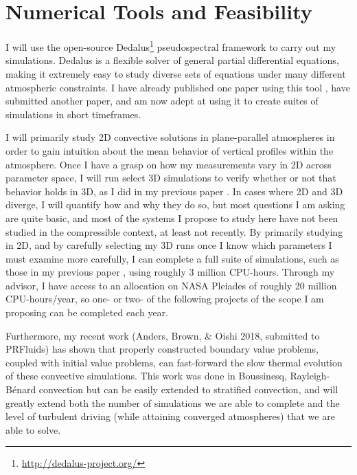 \documentclass[aasms,12pt]{article}
\newcommand{\RB}{Rayleigh-B\'{e}nard }
\begin{document}
\section{Numerical Tools and Feasibility}
I will use the open-source Dedalus\footnote{\url{http://dedalus-project.org/}} pseudospectral framework 
\cite{burns&all2016} to carry out my simulations.  
Dedalus is a flexible solver of general partial differential equations,
making it extremely easy to study diverse sets of equations under many different atmospheric
constraints.  I have already published one paper using this tool \cite{anders&brown2017},
have submitted another paper, and am now adept at using it to create suites of simulations
in short timeframes.

I will primarily study 2D convective solutions in plane-parallel atmospheres in order to gain
intuition about the mean behavior of vertical profiles within the atmosphere.  Once I have a grasp
on how my measurements vary in 2D across parameter space, I will run select 3D simulations to
verify whether or not that behavior holds in 3D, as I did in my previous paper \cite{anders&brown2017}.
In cases where 2D and 3D diverge, I will quantify how and why they do so, but most questions I am
asking are quite basic, and most of the systems I propose to study here have not been studied
in the compressible context, at least not recently.  By primarily studying in 2D, and by carefully
selecting my 3D runs once I know which parameters I must examine more carefully, I can complete
a full suite of simulations, such as those in my previous paper \cite{anders&brown2017}, using
roughly 3 million CPU-hours.  Through my advisor, I have access to an allocation on NASA Pleiades
of roughly 20 million CPU-hours/year, so one- or two- of the following projects of the scope I am
proposing can be completed each year.

Furthermore, my recent work (Anders, Brown, \& Oishi 2018, submitted to PRFluids) has
shown that properly constructed boundary value problems, coupled with initial value problems,
can fast-forward the slow thermal evolution of these convective simulations.  This work was done in 
Boussinesq, \RB convection but can be easily extended to stratified convection, and will greatly
extend both the number of simulations we are able to complete and the level of turbulent driving
(while attaining converged atmospheres) that we are able to solve.
\end{document}

